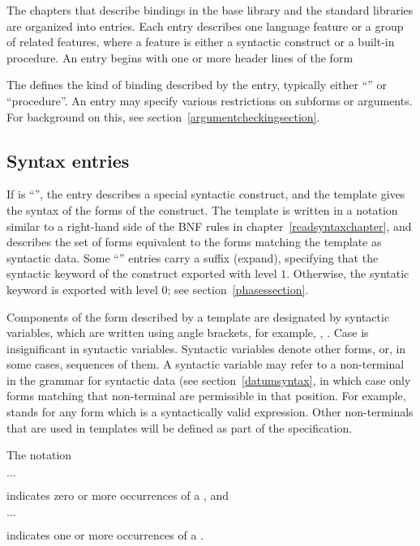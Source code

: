 The chapters that describe bindings in the base library and the standard
libraries are organized
into entries.  Each entry describes one language feature or a group of
related features, where a feature is either a syntactic construct or a
built-in procedure.  An entry begins with one or more header lines of the form

\noindent{}\unpenalty

The  defines the kind of binding described by the entry,
typically either ``\exprtype'' or ``procedure''.
An entry may specify various restrictions on subforms or arguments.
For background on this, see section~\ref{argumentcheckingsection}.

\subsection{Syntax entries}

If  is ``\exprtype'', the entry describes a 
special syntactic construct, and the template gives the syntax of the
forms of the construct.  
The template is written in a notation similar to a right-hand
side of the BNF rules in chapter~\ref{readsyntaxchapter}, and describes
the set of forms equivalent to the forms matching the
template as syntactic data.  Some ``\exprtype'' entries carry a
suffix ({\cf expand}), specifying that the syntactic keyword of the
construct exported with level
$1$.  Otherwise, the syntatic keyword is exported with level $0$; see
section~\ref{phasessection}.

Components of the form described by a template are designated
by syntactic variables, which are written using angle brackets, for
example, , .  Case is insignificant
in syntactic variables.  Syntactic variables
denote other forms, or, in some cases,
sequences of them.  A syntactic variable may refer to a non-terminal
in the grammar for syntactic data (see section~\ref{datumsyntax},
in which case only forms matching
that non-terminal are permissible in that position.  For example,
 stands for any form which is a
syntactically valid expression.  Other non-terminals that are used in
templates will be defined as part of the specification.

The notation
\begin{tabbing}
\qquad {} $\ldots$
\end{tabbing}
indicates zero or more occurrences of a , and
\begin{tabbing}
\qquad {}  $\ldots$
\end{tabbing}
indicates one or more occurrences of a .


